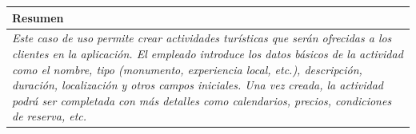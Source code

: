         \begin{table}[H]
            \begin{tabular}{llllllll}
        \hline
        \multicolumn{8}{|l|}{\cellcolor[HTML]{F2F2F2}Resumen}                                                                                                                                                                                                                                                                                                                                                                                             \\ \hline
        \multicolumn{8}{|p{15cm}|}{{\color[HTML]{808080} \textit{Este caso de uso permite crear actividades turísticas que serán ofrecidas a los clientes en la aplicación. El empleado introduce los datos básicos de la actividad como el nombre, tipo (monumento, experiencia local, etc.), descripción, duración, localización y otros campos iniciales. Una vez creada, la actividad podrá ser completada con más detalles como calendarios, precios, condiciones de reserva, etc.}}} \\ \hline
        \end{tabular}
        \end{table}

